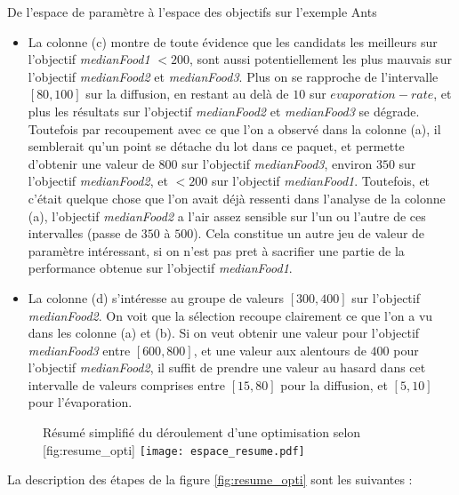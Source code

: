\begin{testiv}{De l'espace de paramètre à l'espace des objectifs sur l'exemple Ants }{}
\begin{itemize}[nolistsep]
	\item La colonne (c) montre de toute évidence que les candidats les meilleurs sur l'objectif \textit{medianFood1} $< 200$, sont aussi potentiellement les plus mauvais sur l'objectif \textit{medianFood2} et \textit{medianFood3}. Plus on se rapproche de l'intervalle $[80, 100]$ sur la diffusion, en restant au delà de $10$ sur $evaporation-rate$, et plus les résultats sur l'objectif \textit{medianFood2} et \textit{medianFood3} se dégrade. Toutefois par recoupement avec ce que l'on a observé dans la colonne (a), il semblerait qu'un point se détache du lot dans ce paquet, et permette d'obtenir une valeur de $800$ sur l'objectif \textit{medianFood3}, environ $350$ sur l'objectif \textit{medianFood2}, et $ < 200$ sur l'objectif \textit{medianFood1}. Toutefois, et c'était quelque chose que l'on avait déjà ressenti dans l'analyse de la colonne (a), l'objectif \textit{medianFood2} a l'air assez sensible sur l'un ou l'autre de ces intervalles (passe de $350$ à $500$). Cela constitue un autre jeu de valeur de paramètre intéressant, si on n'est pas pret à sacrifier une partie de la performance obtenue sur l'objectif \textit{medianFood1}.
	\item La colonne (d) s'intéresse au groupe de valeurs $[300, 400]$ sur l'objectif  \textit{medianFood2}. On voit que la sélection recoupe clairement ce que l'on a vu dans les colonne (a) et (b). Si on veut obtenir une valeur pour l'objectif \textit{medianFood3} entre $[600, 800]$, et une valeur aux alentours de $400$ pour l'objectif \textit{medianFood2}, il suffit de prendre une valeur au hasard dans cet intervalle de valeurs comprises entre $[15, 80]$ pour la diffusion, et $[5, 10]$ pour l'évaporation.
\end{itemize}

\end{testiv}


\begin{figure}[ht]
	\begin{sidecaption}{Résumé simplifié du déroulement d'une optimisation selon \textcite[109]{Weise2011}}[fig:resume_opti]
		\centering
		\texttt{[image: espace\_resume.pdf]}{
		}
  \end{sidecaption}
\end{figure}

La description des étapes de la figure \ref{fig:resume_opti} sont les suivantes :

